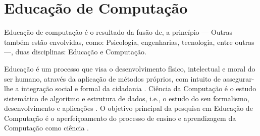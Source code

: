 \documentclass[
	12pt,				%
	openright,			%
	oneside,
	a4paper,			%
	english,			%
	french,				%
	spanish,			%
	brazil,				%
	]{abntex2}
\begin{document}

\section{Educação de Computação}
\label{sec:EC}

Educação de computação é o resultado da fusão de, a princípio --- Outras também estão envolvidas, como: Psicologia, engenharias, tecnologia, entre outras ---, duas disciplinas: Educação e Computação. 

Educação é um processo que visa o desenvolvimento físico, intelectual e moral do ser humano, através da aplicação de métodos próprios, com intuito de assegurar-lhe a integração social e formal da cidadania \cite{weiszflog1999michaelis}. Ciência da Computação é o estudo sistemático de algoritmo e estrutura de dados, i.e., o estudo do seu formalismo, desenvolvimento e aplicações \cite{gibbs1986model}. O objetivo principal da pesquisa em Educação de Computação é o aperfeiçoamento do processo de ensino e aprendizagem da Computação como ciência \cite{holmboe2001research}.
\end{document}
